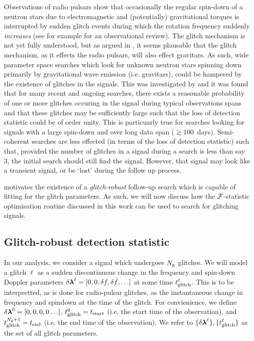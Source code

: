 \documentclass[aps, prd, twocolumn, superscriptaddress, floatfix, showpacs, nofootinbib, longbibliography]{revtex4-1}
\begin{document}
Observations of radio pulsars show that occasionally the regular spin-down of a
neutron stars due to electromagnetic and (potentially) gravitational torques is
interrupted by sudden glitch events during which the rotation frequency
suddenly \emph{increases} (see for example \citet{espinoza2011} for an
observational review). The glitch mechanism is not yet fully understood, but as
argued in \citet{ashton2017}, it seems plausable that the glitch mechanism, as
it effects the radio pulsars, will also effect gravitars. As such, wide
parameter space searches which look for unknown neutron stars spinning down
primarily by gravitational wave emission (i.e. gravitars), could be hampered by
the existence of glitches in the signals. This was investigated by
\citet{ashton2017} and it was found that for many recent and ongoing searches,
there exists a reasonable probability of one or more glitches occuring in the
signal during typical observations spans and that these glitches may be
sufficiently large such that the loss of detection statistic could be of order
unity. This is particuarly true for searches looking for signals with a large
spin-down and over long data span ($\gtrsim 100$~days). Semi-coherent searches
are less effected (in terms of the loss of detection statistic) such that,
provided the number of glitches in a signal during a search is less than say
3, the initial search should still find the signal. However, that signal may
look like a transient signal, or be `lost' during the follow up process.

\citet{ashton2017} motivates the existence of a \emph{glitch-robust} follow-up search
which is capable of fitting for the glitch parameters.  As such, we will now
discuss how the ${\mathcal{F}}$-statistic optimisation routine discussed in this work can
be used to search for glitching signals.

\subsection{Glitch-robust detection statistic}
In our analysis, we consider a signal which undergoes $N_{\rm g}$ glitches.
We will model a glitch $\ell$ as a sudden discontinuous change in the frequency
and spin-down Doppler parameters $\delta \boldsymbol{\mathbf{\lambda}}^\ell = [0, 0, \delta f,
\delta \dot{f}, \ldots]$ at some time $t_{\rm glitch}^\ell$. This is to be
interpretted, as is done for radio-pulsar glitches, as the instantaneous change
in frequency and spindown at the time of the glitch. For convienience, we
define $\delta\boldsymbol{\mathbf{\lambda}}^0 = [0, 0, 0, 0 \ldots]$, $t_{\rm glitch}^0 =
t_\mathrm{start}$ (i.e. the start time of the observation), and
$t_{\rm glitch}^{N_{\rm g}+1}=t_\mathrm{end}$ (i.e. the end time of the
observation).  We refer to $\{\delta\boldsymbol{\mathbf{\lambda}}^{\ell}\}, \{t_{\rm glitch}^\ell\}$ as
the set of all glitch parameters.
\end{document}
